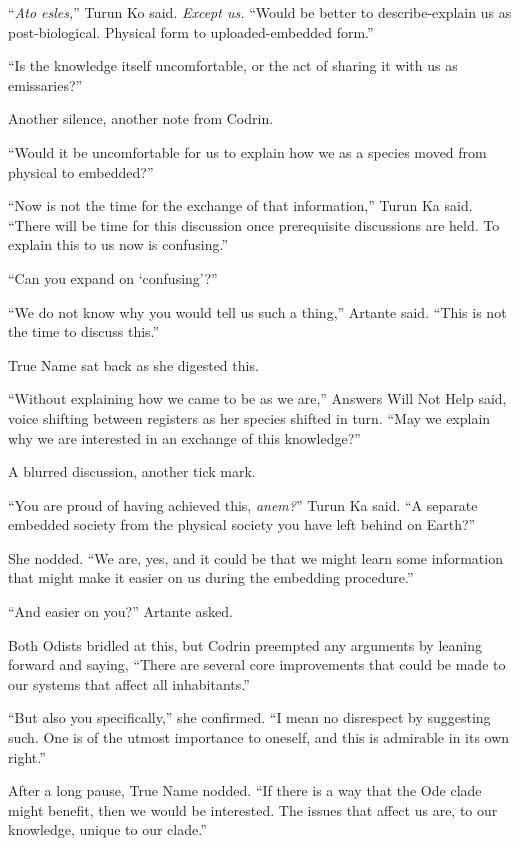 ``\emph{Ato esles,}'' Turun Ko said. \emph{Except us.} ``Would be better to describe-explain us as post-biological. Physical form to uploaded-embedded form.''

``Is the knowledge itself uncomfortable, or the act of sharing it with us as emissaries?''

Another silence, another note from Codrin.

``Would it be uncomfortable for us to explain how we as a species moved from physical to embedded?''

``Now is not the time for the exchange of that information,'' Turun Ka said. ``There will be time for this discussion once prerequisite discussions are held. To explain this to us now is confusing.''

``Can you expand on `confusing'?''

``We do not know why you would tell us such a thing,'' Artante said. ``This is not the time to discuss this.''

True Name sat back as she digested this.

``Without explaining how we came to be as we are,'' Answers Will Not Help said, voice shifting between registers as her species shifted in turn. ``May we explain why we are interested in an exchange of this knowledge?''

A blurred discussion, another tick mark.

``You are proud of having achieved this, \emph{anem?}'' Turun Ka said. ``A separate embedded society from the physical society you have left behind on Earth?''

She nodded. ``We are, yes, and it could be that we might learn some information that might make it easier on us during the embedding procedure.''

``And easier on you?'' Artante asked.

Both Odists bridled at this, but Codrin preempted any arguments by leaning forward and saying, ``There are several core improvements that could be made to our systems that affect all inhabitants.''

``But also you specifically,'' she confirmed. ``I mean no disrespect by suggesting such. One is of the utmost importance to oneself, and this is admirable in its own right.''

After a long pause, True Name nodded. ``If there is a way that the Ode clade might benefit, then we would be interested. The issues that affect us are, to our knowledge, unique to our clade.''

